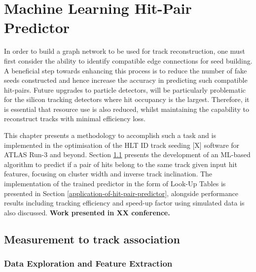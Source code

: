 

\doublespacing
\newpage
\chapter{Machine Learning Hit-Pair Predictor} 
\label{chapter-4}

In order to build a graph network to be used for track reconstruction, one must first consider the ability to identify compatible edge connections for seed building. A beneficial step towards enhancing this process is to reduce the number of fake seeds constructed and hence increase the accuracy in predicting such compatible hit-pairs. Future upgrades to particle detectors, will be particularly problematic for the silicon tracking detectors where hit occupancy is the largest. Therefore, it is essential that resource use is also reduced, whilst maintaining the capability to reconstruct tracks with minimal efficiency loss.

This chapter presents a methodology to accomplish such a task and is implemented in the optimisation of the HLT ID track seeding [X] software for ATLAS Run-3 and beyond. Section \ref{measurement-to-track-association} presents the development of an ML-based algorithm to predict if a pair of hits belong to the same track given input hit features, focusing on cluster width and inverse track inclination. The implementation of the trained predictor in the form of Look-Up Tables is presented in Section \ref{application-of-hit-pair-predictor}, alongside performance results including tracking efficiency and speed-up factor using simulated data is also discussed. \textbf{Work presented in XX conference.}


\section{Measurement to track association}
\label{measurement-to-track-association}

\subsection{Data Exploration and Feature Extraction}

